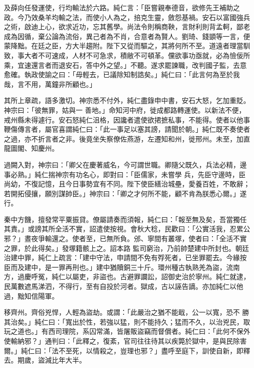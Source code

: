 \begin{pinyinscope}
 及薛向任發運使，行均輸法於六路。純仁言：「臣嘗親奉德音，欲修先王補助之政。今乃效桑羊均輸之法，而使小人為之，掊克生靈，斂怨基禍。安石以富國強兵之術，啟迪上心，欲求近功，忘其舊學。尚法令則稱商鞅，言財利則背孟軻，鄙老成為因循，棄公論為流俗，異己者為不肖，合意者為賢人。劉琦、錢顗等一言，便
 蒙降黜。在廷之臣，方大半趨附。陛下又從而驅之，其將何所不至。道遠者理當馴致，事大者不可速成，人材不可急求，積敝不可頓革。儻欲事功亟就，必為憸佞所乘，宜速還言者而退安石，答中外之望。」不聽。遂求罷諫職，改判國子監，去意愈確。執政使諭之曰：「毋輕去，已議除知制誥矣。」純仁曰：「此言何為至於我哉，言不用，萬鐘非所顧也。」



 其所上章疏，語多激切。神宗悉不付外，純仁盡錄申中書，安石大怒，乞加重貶。神宗曰：「彼無罪，姑與一
 善地。」命知河中府，徙成都路轉運使。以新法不便，戒州縣未得遽行。安石怒純仁沮格，因讒者遣使欲捃摭私事，不能得。使者以他事鞭傷傳言者，屬官喜謂純仁曰：「此一事足以塞其謗，請聞於朝。」純仁既不奏使者之過，亦不折言者之非。後竟坐失察僚佐燕游，左遷知和州，徙邢州。未至，加直龍圖閣、知慶州。



 過闕入對，神宗曰：「卿父在慶著威名，今可謂世職。卿隨父既久，兵法必精，邊事必熟。」純仁揣神宗有功名心，即對曰：「臣儒家，未嘗學
 兵，先臣守邊時，臣尚幼，不復記憶，且今日事勢宜有不同。陛下使臣繕治城壘，愛養百姓，不敢辭；若開拓侵攘，願別謀帥臣。」神宗曰：「卿之才何所不能，顧不肯為朕悉心爾。」遂行。



 秦中方饑，擅發常平粟振貸。僚屬請奏而須報，純仁曰：「報至無及矣，吾當獨任其責。」或謗其所全活不實，詔遣使按視。會秋大稔，民歡曰：「公實活我，忍累公邪？」晝夜爭輸還之。使者至，已無所負。邠、寧間有叢塚，使者曰：「全活不實之罪，於此得矣。」發塚籍骸上之。詔本路
 監司窮治，乃前帥楚建中所封也。朝廷治建中罪，純仁上疏言：「建中守法，申請間不免有殍死者，已坐罪罷去。今緣按臣而及建中，是一罪再刑也。」建中猶贖銅三十斤。環州種古執熟羌為盜，流南方，過慶呼冤，純仁以屬吏，非盜也。古避罪讕訟，詔御史治於寧州。純仁就逮，民萬數遮馬涕泗，不得行，至有自投於河者。獄成，古以誣告謫。亦加純仁以他過，黜知信陽軍。



 移齊州。齊俗兇悍，人輕為盜劫。或謂：「此嚴治之猶不能戢，公一以寬，恐不
 勝其治矣。」純仁曰：「寬出於性，若強以猛，則不能持久；猛而不久，以治兇民，取玩之道也。」有西司理院，系囚常滿，皆屠販盜竊而督償者。純仁曰：「此何不保外使輸納邪？」通判曰：「此釋之，復紊，官司往往待其以疾斃於獄中，是與民除害爾。」純仁曰：「法不至死，以情殺之，豈理也邪？」盡呼至庭下，訓使自新，即釋去。期歲，盜減比年大半。




\end{pinyinscope}
